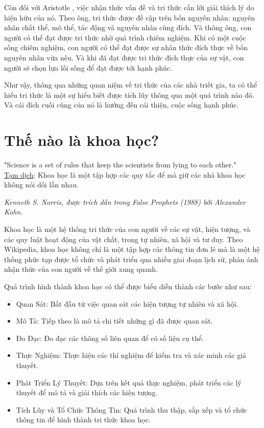 Còn đối với Aristotle , việc nhận thức vấn đề và tri thức cần lời giải thích lý do hiện hữu của nó. Theo ông, tri thức được đề cập trên bốn nguyên nhân: nguyên nhân chất thể, mô thể, tác động và nguyên nhân cùng đích. Và thông ông, con người có thể đạt được tri thức nhờ quá trình chiêm nghiệm. Khi có một cuộc sống chiêm nghiệm, con người có thể đạt được sự nhân thức đích thực về bốn nguyên nhân vừa nêu. Và khi đã đạt được tri thức đích thực của sự vật, con người sẽ chọn lựa lối sống để đạt được tới hạnh phúc. 

Như vậy, thông qua những quan niệm về tri thức của các nhà triết gia, ta có thể hiểu tri thức là một sự hiểu biết được tích lũy thông qua một quá trình nào đó. Và cái đích cuối cùng của nó là hướng đến cái thiện, cuộc sống hạnh phúc.

\section{Thế nào là khoa học?}

\epigraph{"Science is a set of rules that keep the scientists from lying to each other."\\
\underline{Tạm dịch}: Khoa học là một tập hợp các quy tắc để mà giữ các nhà khoa học không nói dối lẫn nhau.
}{\textit{Kenneth S. Norris, được trích dẫn trong False Prophets (1988) bởi Alexander Kohn.}}

Khoa học là một hệ thống tri thức của con người về các sự vật, hiện tượng, và các quy luật hoạt động của vật chất, trong tự nhiên, xã hội và tư duy. Theo Wikipedia, khoa học không chỉ là một tập hợp các thông tin đơn lẻ mà là một hệ thống phức tạp được tổ chức và phát triển qua nhiều giai đoạn lịch sử, phản ánh nhận thức của con người về thế giới xung quanh.

Quá trình hình thành khoa học có thể được biểu diễn thành các bước như sau:
\begin{itemize}
    \item Quan Sát: Bắt đầu từ việc quan sát các hiện tượng tự nhiên và xã hội.
    \item Mô Tả: Tiếp theo là mô tả chi tiết những gì đã được quan sát.
    \item Đo Đạc: Đo đạc các thông số liên quan để có số liệu cụ thể.
    \item Thực Nghiệm: Thực hiện các thí nghiệm để kiểm tra và xác minh các giả thuyết.
    \item Phát Triển Lý Thuyết: Dựa trên kết quả thực nghiệm, phát triển các lý thuyết để mô tả và giải thích các hiện tượng.
    \item Tích Lũy và Tổ Chức Thông Tin: Quá trình thu thập, sắp xếp và tổ chức thông tin để hình thành tri thức khoa học.
\end{itemize}

